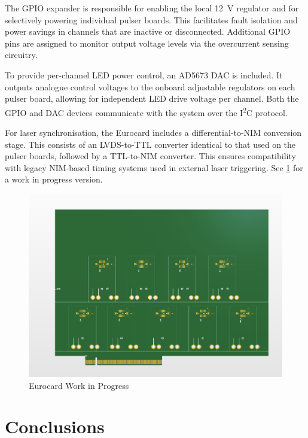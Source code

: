 \documentclass[a4paper,11pt]{article}
\begin{document}
The GPIO expander is responsible for enabling the local \SI{12}{\volt} regulator and for selectively powering individual pulser boards. This facilitates fault isolation and power savings in channels that are inactive or disconnected. Additional GPIO pins are assigned to monitor output voltage levels via the overcurrent sensing circuitry.

To provide per-channel LED power control, an AD5673 \cite{AD5673} DAC is included. It outputs analogue control voltages to the onboard adjustable regulators on each pulser board, allowing for independent LED drive voltage per channel. Both the GPIO and DAC devices communicate with the system over the I\textsuperscript{2}C protocol.

For laser synchronisation, the Eurocard includes a differential-to-NIM conversion stage. This consists of an LVDS-to-TTL converter identical to that used on the pulser boards, followed by a TTL-to-NIM converter. This ensures compatibility with legacy NIM-based timing systems used in external laser triggering. See \cref{fig:EurocardWIP} for a work in progress version.

\begin{figure}[htbp]
\centering
\includegraphics[scale=0.5]{EurocardWIP.png}
\caption{Eurocard Work in Progress\label{fig:EurocardWIP}}
\end{figure}




\section{Conclusions}
\end{document}
